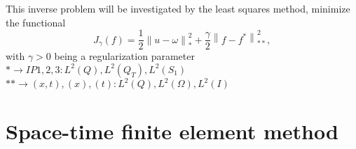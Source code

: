 \documentclass[]{article}
\begin{document}
This inverse problem will be investigated by the least squares method, minimize the functional
$$J_{\gamma}(f)=\frac{1}{2}\left\|u-\omega\right\|_{*}^2+\frac{\gamma}{2}\left\|f-f^*\right\|_{**}^2,$$
with $\gamma>0$ being a regularization parameter\\
$*\to IP1, 2, 3: L^2(Q), L^2(Q_T), L^2(S_1)$\\
$** \to (x, t), (x), (t): L^2(Q), L^2(\Omega), L^2(I)$


\section{Space-time finite element method}
\end{document}
